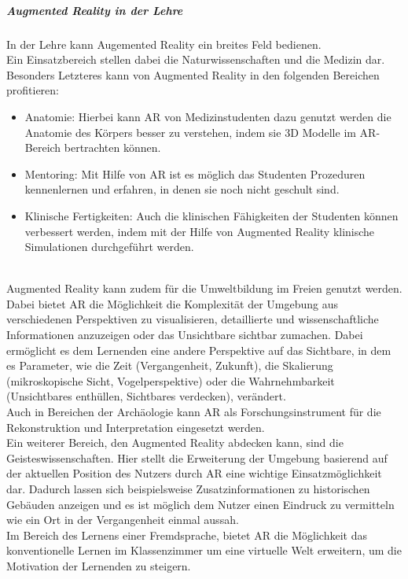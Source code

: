 \subparagraph{Augmented Reality in der Lehre}
In der Lehre kann Augemented Reality ein breites Feld bedienen.\\
Ein Einsatzbereich stellen dabei die Naturwissenschaften und die Medizin dar.
Besonders Letzteres kann von Augmented Reality in den folgenden Bereichen profitieren:
\begin{itemize}
\item Anatomie: Hierbei kann AR von Medizinstudenten dazu genutzt werden die Anatomie des Körpers besser zu verstehen, indem sie 3D Modelle im AR-Bereich bertrachten können.
\item Mentoring: Mit Hilfe von AR ist es möglich das Studenten Prozeduren kennenlernen und erfahren, in denen sie noch nicht geschult sind. 
\item Klinische Fertigkeiten: Auch die klinischen Fähigkeiten der Studenten können verbessert werden, indem mit der Hilfe von Augmented Reality klinische Simulationen durchgeführt werden.
\end{itemize}
\citep[Kapitel 7-9]{geroimenko:ar-in-education} \\
Augmented Reality kann zudem für die Umweltbildung im Freien genutzt werden. Dabei bietet AR die Möglichkeit die Komplexität der Umgebung aus verschiedenen Perspektiven zu visualisieren, detaillierte und wissenschaftliche Informationen anzuzeigen oder das \glqq Unsichtbare\grqq{} sichtbar zumachen.
Dabei ermöglicht es dem Lernenden eine andere Perspektive auf das Sichtbare, in dem es Parameter, wie die Zeit (Vergangenheit, Zukunft), die Skalierung (mikroskopische Sicht, Vogelperspektive) oder die Wahrnehmbarkeit (Unsichtbares enthüllen, Sichtbares verdecken), verändert. \citep[Kapitel 17]{geroimenko:ar-in-education}\\
Auch in Bereichen der Archäologie kann AR als Forschungsinstrument für die Rekonstruktion und Interpretation eingesetzt werden. \citep[Kapitel 17]{geroimenko:ar-in-education}\\
Ein weiterer Bereich, den Augmented Reality abdecken kann, sind die Geisteswissenschaften.
Hier stellt die Erweiterung der Umgebung basierend auf der aktuellen Position des Nutzers durch AR eine wichtige Einsatzmöglichkeit dar. Dadurch lassen sich beispielsweise Zusatzinformationen zu historischen Gebäuden anzeigen und es ist möglich dem Nutzer einen Eindruck zu vermitteln wie ein Ort in der Vergangenheit einmal aussah. \citep[Kapitel 11-12]{geroimenko:ar-in-education}\\
Im Bereich des Lernens einer Fremdsprache, bietet AR die Möglichkeit das konventionelle Lernen im Klassenzimmer um eine virtuelle Welt erweitern, um die Motivation der Lernenden zu steigern. \citep[Kapitel 11-12]{geroimenko:ar-in-education}

